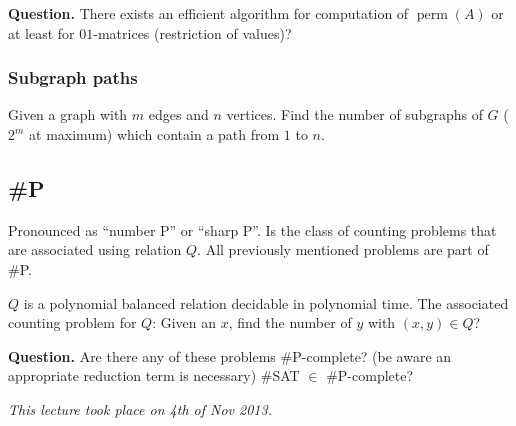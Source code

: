 \documentclass[a4paper]{article}
\newcommand{\cls}[1]{\rm{#1}}
\newcommand{\dateref}[1]{\emph{This lecture took place on #1.}\par}
\begin{document}
\textbf{Question.}
  There exists an efficient algorithm for computation of $\operatorname{perm}(A)$
  or at least for $01$-matrices (restriction of values)?

\subsubsection{Subgraph paths}
%
Given a graph with $m$ edges and $n$ vertices. Find the number of
subgraphs of $G$ ($2^m$ at maximum) which contain a path from $1$ to $n$.

\subsection{\#P}
%
Pronounced as ``number P'' or ``sharp P''.
Is the class of counting problems that are associated using relation $Q$.
All previously mentioned problems are part of \cls{\#P}.

$Q$ is a polynomial balanced relation decidable in polynomial time.
The associated counting problem for $Q$: Given an $x$, find the number
of $y$ with $(x, y) \in Q$?

\textbf{Question.}
  Are there any of these problems \cls{\#P}-complete?
  (be aware an appropriate reduction term is necessary)
  \#SAT $\in$ \cls{\#P}-complete?

\dateref{4th of Nov 2013}
\end{document}
